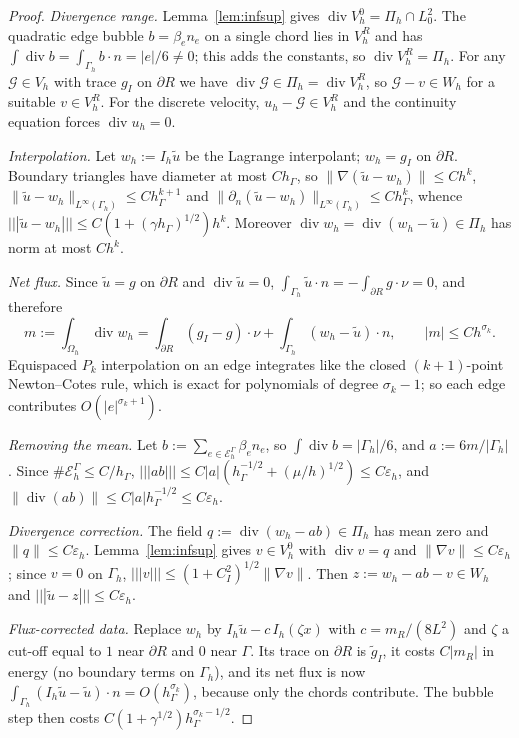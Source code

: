 \documentclass[pdflatex,sn-mathphys-num]{sn-jnl}
\theoremstyle{thmstyleone}
\theoremstyle{thmstylethree}
\newcommand{\hG}{h_\Gamma}
\newcommand{\Gh}{\Gamma_h}
\newcommand{\Oh}{\Omega_h}
\newcommand{\EG}{\mathcal E_h^\Gamma}
\newcommand{\Vh}{V_h}
\newcommand{\VR}{V_h^R}
\newcommand{\VO}{V_h^0}
\newcommand{\Pih}{\Pi_h}
\newcommand{\Wh}{W_h}
\newcommand{\gI}{g_I}
\newcommand{\dn}{\partial_n}
\newcommand{\ut}{\tilde u}
\newcommand{\tnorm}[1]{|\!|\!|#1|\!|\!|}
\newcommand{\norm}[1]{\lVert #1\rVert}
\newcommand{\eps}{\varepsilon_h}
\renewcommand{\div}{\operatorname{div}}
\begin{document}
\begin{proof}
\emph{Divergence range.} Lemma~\ref{lem:infsup} gives $\div\VO=\Pih\cap L^2_0$. The quadratic edge bubble $b=\beta_en_e$ on a single chord lies in $\VR$ and has $\int\div b=\int_{\Gh}b\cdot n=|e|/6\ne0$; this adds the constants, so $\div\VR=\Pih$. For any $\mathcal G\in\Vh$ with trace $\gI$ on $\partial R$ we have $\div\mathcal G\in\Pih=\div\VR$, so $\mathcal G-v\in\Wh$ for a suitable $v\in\VR$. For the discrete velocity, $u_h-\mathcal G\in\VR$ and the continuity equation forces $\div u_h=0$.

\emph{Interpolation.} Let $w_h:=I_h\ut$ be the Lagrange interpolant; $w_h=\gI$ on $\partial R$. Boundary triangles have diameter at most $C\hG$, so $\norm{\nabla(\ut-w_h)}\le Ch^k$, $\norm{\ut-w_h}_{L^\infty(\Gh)}\le C\hG^{k+1}$ and $\norm{\dn(\ut-w_h)}_{L^\infty(\Gh)}\le C\hG^k$, whence $\tnorm{\ut-w_h}\le C(1+(\gamma\hG)^{1/2})h^k$. Moreover $\div w_h=\div(w_h-\ut)\in\Pih$ has norm at most $Ch^k$.

\emph{Net flux.} Since $\ut=g$ on $\partial R$ and $\div\ut=0$, $\int_{\Gh}\ut\cdot n=-\int_{\partial R}g\cdot\nu=0$, and therefore
\[
m:=\int_{\Oh}\div w_h=\int_{\partial R}(\gI-g)\cdot\nu+\int_{\Gh}(w_h-\ut)\cdot n,\qquad |m|\le Ch^{\sigma_k}.
\]
Equispaced $P_k$ interpolation on an edge integrates like the closed $(k+1)$-point Newton--Cotes rule, which is exact for polynomials of degree $\sigma_k-1$; so each edge contributes $O(|e|^{\sigma_k+1})$.

\emph{Removing the mean.} Let $b:=\sum_{e\in\EG}\beta_en_e$, so $\int\div b=|\Gh|/6$, and $a:=6m/|\Gh|$. Since $\#\EG\le C/\hG$,
$\tnorm{ab}\le C|a|(\hG^{-1/2}+(\mu/h)^{1/2})\le C\eps$, and $\norm{\div(ab)}\le C|a|\hG^{-1/2}\le C\eps$.

\emph{Divergence correction.} The field $q:=\div(w_h-ab)\in\Pih$ has mean zero and $\norm q\le C\eps$. Lemma~\ref{lem:infsup} gives $v\in\VO$ with $\div v=q$ and $\norm{\nabla v}\le C\eps$; since $v=0$ on $\Gh$, $\tnorm v\le(1+C_I^2)^{1/2}\norm{\nabla v}$. Then $z:=w_h-ab-v\in\Wh$ and $\tnorm{\ut-z}\le C\eps$.

\emph{Flux-corrected data.} Replace $w_h$ by $I_h\ut-c\,I_h(\zeta x)$ with $c=m_R/(8L^2)$ and $\zeta$ a cut-off equal to $1$ near $\partial R$ and $0$ near $\Gamma$. Its trace on $\partial R$ is $\tilde g_I$, it costs $C|m_R|$ in energy (no boundary terms on $\Gh$), and its net flux is now $\int_{\Gh}(I_h\ut-\ut)\cdot n=O(\hG^{\sigma_k})$, because only the chords contribute. The bubble step then costs $C(1+\gamma^{1/2})\hG^{\sigma_k-1/2}$.
\end{proof}
\end{document}
